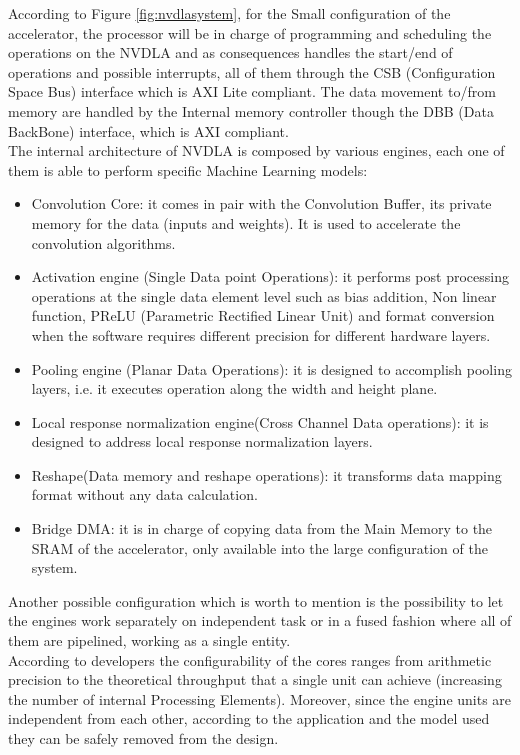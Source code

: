 According to Figure \ref{fig:nvdlasystem}, for the Small configuration of the accelerator, the processor will be in charge of programming and scheduling the operations on the NVDLA and as consequences handles the start/end of operations and possible interrupts, all of them through the CSB (Configuration Space Bus) interface which is AXI Lite compliant\cite{paper:30}. \newline
The data movement to/from memory are handled by the Internal memory controller though the DBB (Data BackBone) interface, which is AXI \cite{paper:30} compliant.\\

The internal architecture of NVDLA is composed by various engines, each one of them is able to perform specific Machine Learning models:
\begin{itemize}
\item Convolution Core: it comes in pair with the Convolution Buffer, its private memory for the data (inputs and weights). It is used to accelerate the convolution algorithms.
\item Activation engine (Single Data point Operations): it performs post processing operations at the single data element level such as bias addition, Non linear function, PReLU (Parametric Rectified Linear Unit) and format conversion when the software requires different precision for different hardware layers.
\item Pooling engine (Planar Data Operations): it is designed to accomplish pooling layers, i.e. it executes operation along the width and height plane.
\item Local response normalization engine(Cross Channel Data operations): it is designed to address local response normalization layers.
\item Reshape(Data memory and reshape operations): it transforms data mapping format without any data calculation.
\item Bridge DMA: it is in charge of copying data from the Main Memory to the SRAM of the accelerator, only available into the large configuration of the system.
\end{itemize}


Another possible configuration which is worth to mention is the possibility to let the engines work separately on independent task or in a fused fashion where all of them are pipelined, working as a single entity.\\

According to developers the configurability of the cores ranges from arithmetic precision to the theoretical throughput that a single unit can achieve (increasing the number of internal Processing Elements). Moreover, since the engine units are independent from each other, according to the application and the model used they can be safely removed from the design.
\newpage
